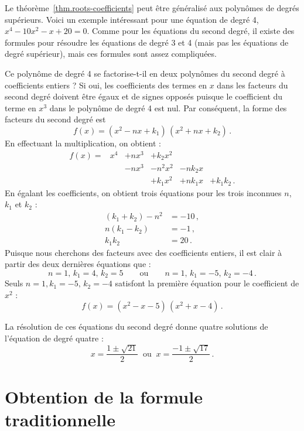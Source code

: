 \begin{example}
Le théorème~\ref{thm.roots-coefficients} peut être généralisé aux polynômes de degrés supérieurs. Voici un exemple intéressant pour une équation de degré 4,  $x^4-10x^2-x+20=0$. Comme pour les équations du second degré, il existe des formules pour résoudre les équations de degré 3 et 4 (mais pas les équations de degré supérieur), mais ces formules sont assez compliquées.

Ce polynôme de degré 4 se factorise-t-il en deux polynômes du second degré à coefficients entiers ? Si oui, les coefficients des termes en $x$ dans les facteurs du second degré doivent être égaux et de signes opposés puisque le coefficient du terme en $x^3$ dans le polynôme de degré 4 est nul. Par conséquent, la forme des facteurs du second degré est 
\[
f(x) = (x^2 - nx + k_1)\, (x^2 + nx + k_2)\,.
\]
En effectuant la multiplication, on obtient :
\[
\renewcommand{\arraystretch}{1.1}
\begin{array}{rrrrrr}
f(x) = &x^4 & + nx^3 & + k_2 x^2\\
&& -nx^3 &- n^2x^2 &-nk_2x\\
&&&+k_1x^2 &+ nk_1x &+ k_1k_2\,.
\end{array}
\]
En égalant les coefficients, on obtient trois équations pour les trois inconnues $n$, $k_1$ et $k_2$ :
\begin{align*}
(k_1+k_2)-n^2 &= -10\,,\\
n(k_1-k_2) &= -1\,,\\
k_1k_2 &= 20\,.
\end{align*}
Puisque nous cherchons des facteurs avec des coefficients entiers,  il est clair à partir des deux dernières équations que :
\[
n=1,\,k_1=4,\,k_2=5  \quad\quad\textrm{ou} \quad\quad n=1,\,k_1=-5,\, k_2=-4\,.
\]
Seuls $n=1,k_1=-5,\, k_2=-4$ satisfont la première équation pour le coefficient de $x^2$ :
\[
f(x) = (x^2 - x - 5)\, (x^2 + x - 4)\,.
\]



La résolution de ces équations du second degré donne quatre solutions de l'équation de degré quatre :
\[
x = \frac{1\pm\sqrt{21}}{2}  \;\;\textrm{ou} \;\; x= \frac{-1\pm\sqrt{17}}{2} \,.
\]
\end{example}

\section{Obtention de la formule traditionnelle}\label{s.general}

